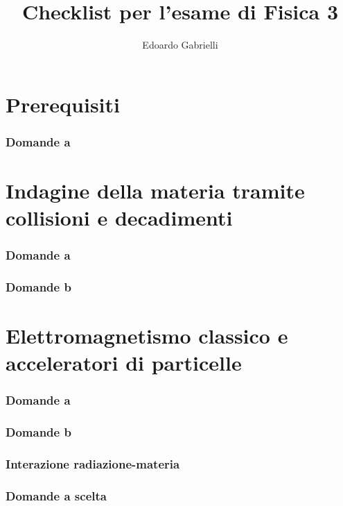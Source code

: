 \documentclass[10pt,a4paper]{article}
\author{Edoardo Gabrielli}
\title{Checklist per l'esame di Fisica 3}
\begin{document}
\maketitle
\clearpage

\begin{multicols}{2}
	\tableofcontents
\end{multicols}

\listoffigures
\clearpage


\part{Prerequisiti}
\section{Domande a}


\part{Indagine della materia tramite collisioni e decadimenti}
\setcounter{section}{0}
\renewcommand*{\theHsection}{chX.\the\value{section}}
\section{Domande a}
\section{Domande b}


\part{Elettromagnetismo classico e acceleratori di particelle}
\setcounter{section}{0}
\renewcommand*{\theHsection}{chX.\the\value{section}}
\section{Domande a}
\section{Domande b}



\section{Interazione radiazione-materia}
\setcounter{section}{0}
\renewcommand*{\theHsection}{chX.\the\value{section}}


\section{Domande a scelta}
 
\end{document}
